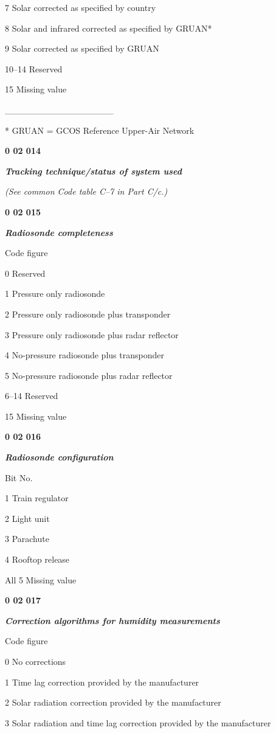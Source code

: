 7 Solar corrected as specified by country

8 Solar and infrared corrected as specified by GRUAN*

9 Solar corrected as specified by GRUAN

10--14 Reserved

15 Missing value

\_\_\_\_\_\_\_\_\_\_\_\_\_\_\_\_\_

* GRUAN = GCOS Reference Upper-Air Network

\textbf{0 02 014}

\emph{\textbf{Tracking technique/status of system used}}

\emph{(See common Code table C--7 in Part C/c.)}

\textbf{0 02 015}

\emph{\textbf{Radiosonde completeness}}

Code figure

0 Reserved

1 Pressure only radiosonde

2 Pressure only radiosonde plus transponder

3 Pressure only radiosonde plus radar reflector

4 No-pressure radiosonde plus transponder

5 No-pressure radiosonde plus radar reflector

6--14 Reserved

15 Missing value

\textbf{0 02 016}

\emph{\textbf{Radiosonde configuration}}

Bit No.

1 Train regulator

2 Light unit

3 Parachute

4 Rooftop release

All 5 Missing value

\textbf{0 02 017}

\emph{\textbf{Correction algorithms for humidity measurements}}

Code figure

0 No corrections

1 Time lag correction provided by the manufacturer

2 Solar radiation correction provided by the manufacturer

3 Solar radiation and time lag correction provided by the manufacturer

